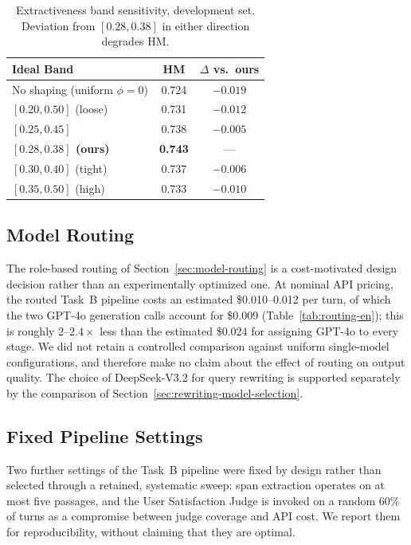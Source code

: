 \begin{table}[h]
\centering
\small
\begin{tabular}{lcc}
\toprule
\textbf{Ideal Band} & \textbf{HM} & \textbf{$\Delta$ vs.\ ours} \\
\midrule
No shaping (uniform $\phi{=}0$) & 0.724 & $-0.019$ \\
$[0.20, 0.50]$ (loose) & 0.731 & $-0.012$ \\
$[0.25, 0.45]$ & 0.738 & $-0.005$ \\
\textbf{$[0.28, 0.38]$ (ours)} & \textbf{0.743} & --- \\
$[0.30, 0.40]$ (tight) & 0.737 & $-0.006$ \\
$[0.35, 0.50]$ (high) & 0.733 & $-0.010$ \\
\bottomrule
\end{tabular}
\caption{Extractiveness band sensitivity, development set. Deviation from $[0.28, 0.38]$ in either direction degrades HM.}
\label{tab:extractiveness-band-en}
\end{table}

\subsection{Model Routing}

The role-based routing of Section~\ref{sec:model-routing} is a cost-motivated design decision rather than an experimentally optimized one. At nominal API pricing, the routed Task~B pipeline costs an estimated \$0.010--0.012 per turn, of which the two GPT-4o generation calls account for \$0.009 (Table~\ref{tab:routing-en}); this is roughly $2$--$2.4\times$ less than the estimated \$0.024 for assigning GPT-4o to every stage. We did not retain a controlled comparison against uniform single-model configurations, and therefore make no claim about the effect of routing on output quality. The choice of DeepSeek-V3.2 for query rewriting is supported separately by the comparison of Section~\ref{sec:rewriting-model-selection}.

\subsection{Fixed Pipeline Settings}
\label{sec:additional-sweeps}

Two further settings of the Task~B pipeline were fixed by design rather than selected through a retained, systematic sweep: span extraction operates on at most five passages, and the User Satisfaction Judge is invoked on a random $60\%$ of turns as a compromise between judge coverage and API cost. We report them for reproducibility, without claiming that they are optimal.

